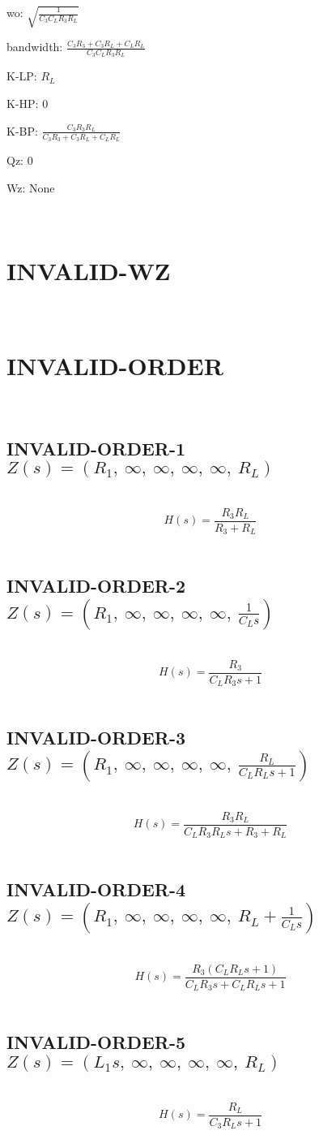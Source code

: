 \documentclass{article}
\begin{document}
wo: $\sqrt{\frac{1}{C_{3} C_{L} R_{3} R_{L}}}$\ 

bandwidth: $\frac{C_{3} R_{3} + C_{3} R_{L} + C_{L} R_{L}}{C_{3} C_{L} R_{3} R_{L}}$\ 

K-LP: $R_{L}$\ 

K-HP: $0$\ 

K-BP: $\frac{C_{3} R_{3} R_{L}}{C_{3} R_{3} + C_{3} R_{L} + C_{L} R_{L}}$\ 

Qz: $0$\ 

Wz: $\text{None}$\ 

\ 

\section{INVALID-WZ}\ 
\section{INVALID-ORDER}\ 
\subsection{INVALID-ORDER-1 $Z(s) = \left( R_{1}, \  \infty, \  \infty, \  \infty, \  \infty, \  R_{L}\right)$ } \ 
\textbf{\[H(s) = \frac{R_{3} R_{L}}{R_{3} + R_{L}}\] } \ 
\subsection{INVALID-ORDER-2 $Z(s) = \left( R_{1}, \  \infty, \  \infty, \  \infty, \  \infty, \  \frac{1}{C_{L} s}\right)$ } \ 
\textbf{\[H(s) = \frac{R_{3}}{C_{L} R_{3} s + 1}\] } \ 
\subsection{INVALID-ORDER-3 $Z(s) = \left( R_{1}, \  \infty, \  \infty, \  \infty, \  \infty, \  \frac{R_{L}}{C_{L} R_{L} s + 1}\right)$ } \ 
\textbf{\[H(s) = \frac{R_{3} R_{L}}{C_{L} R_{3} R_{L} s + R_{3} + R_{L}}\] } \ 
\subsection{INVALID-ORDER-4 $Z(s) = \left( R_{1}, \  \infty, \  \infty, \  \infty, \  \infty, \  R_{L} + \frac{1}{C_{L} s}\right)$ } \ 
\textbf{\[H(s) = \frac{R_{3} \left(C_{L} R_{L} s + 1\right)}{C_{L} R_{3} s + C_{L} R_{L} s + 1}\] } \ 
\subsection{INVALID-ORDER-5 $Z(s) = \left( L_{1} s, \  \infty, \  \infty, \  \infty, \  \infty, \  R_{L}\right)$ } \ 
\textbf{\[H(s) = \frac{R_{L}}{C_{3} R_{L} s + 1}\] } \ 
\end{document}
